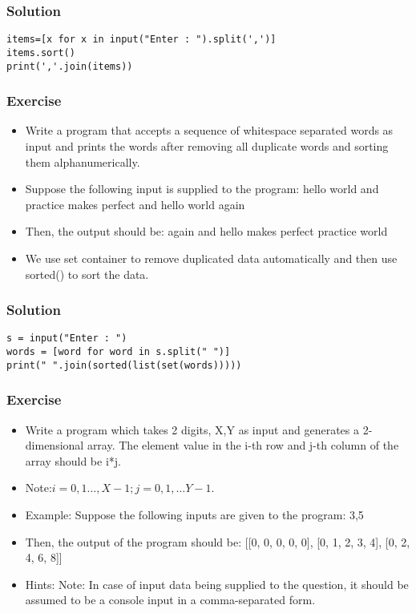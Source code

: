 \begin{frame}[fragile]\frametitle{Solution}
  \begin{lstlisting}
items=[x for x in input("Enter : ").split(',')]
items.sort()
print(','.join(items))
  \end{lstlisting}
\end{frame}

\begin{frame}[fragile]\frametitle{Exercise}
  \begin{itemize}
  \item Write a program that accepts a sequence of whitespace separated words as input and prints the words after removing all duplicate words and sorting them alphanumerically.
  \item Suppose the following input is supplied to the program: hello world and practice makes perfect and hello world again
  \item Then, the output should be: again and hello makes perfect practice world
  \item We use set container to remove duplicated data automatically and then use sorted() to sort the data.
  \end{itemize}  
\end{frame}

\begin{frame}[fragile]\frametitle{Solution}
  \begin{lstlisting}
s = input("Enter : ")
words = [word for word in s.split(" ")]
print(" ".join(sorted(list(set(words)))))
  \end{lstlisting}
\end{frame}



\begin{frame}[fragile]\frametitle{Exercise}
  \begin{itemize}
  \item Write a program which takes 2 digits, X,Y as input and generates a 2-dimensional array. The element value in the i-th row and j-th column of the array should be i*j.
  \item Note:$ i=0,1 \ldots, X-1; j=0,1, \ldots Y-1.$
  \item Example: Suppose the following inputs are given to the program: 3,5
  \item Then, the output of the program should be: [[0, 0, 0, 0, 0], [0, 1, 2, 3, 4], [0, 2, 4, 6, 8]] 
  \item Hints: Note: In case of input data being supplied to the question, it should be assumed to be a console input in a comma-separated form.

  \end{itemize}  
\end{frame}

